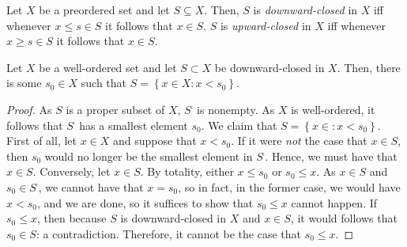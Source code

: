 \begin{dfn}
Let $X$ be a preordered set and let $S\subseteq X$.  Then, $S$ is \emph{downward-closed} in $X$ iff whenever $x\leq s\in S$ it follows that $x\in S$.  $S$ is \emph{upward-closed} in $X$ iff whenever $x\geq s\in S$ it follows that $x\in S$.
\end{dfn}
\begin{prp}\label{prpA.1.56}
Let $X$ be a well-ordered set and let $S\subset X$ be downward-closed in $X$.  Then, there is some $s_0\in X$ such that $S=\left\{ x\in X:x<s_0\right\}$.
\begin{proof}
As $S$ is a proper subset of $X$, $S^{\comp}$ is nonempty.  As $X$ is well-ordered, it follows that $S^{\comp}$ has a smallest element $s_0$.  We claim that $S=\left\{ x\in :x<s_0\right\}$.  First of all, let $x\in X$ and suppose that $x<s_0$.  If it were \emph{not} the case that $x\in S$, then $s_0$ would no longer be the smallest element in $S^{\comp}$.  Hence, we must have that $x\in S$.  Conversely, let $x\in S$.  By totality, either $x\leq s_0$ or $s_0\leq x$.  As $x\in S$ and $s_0\in S^{\comp}$, we cannot have that $x=s_0$, so in fact, in the former case, we would have $x<s_0$, and we are done, so it suffices to show that $s_0\leq x$ cannot happen.  If $s_0\leq x$, then because $S$ is downward-closed in $X$ and $x\in S$, it would follows that $s_0\in S$:  a contradiction.  Therefore, it cannot be the case that $s_0\leq x$.
\end{proof}
\end{prp}
